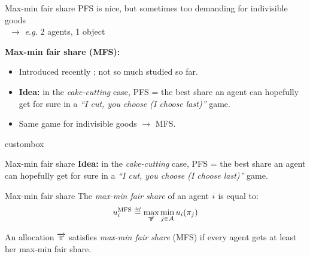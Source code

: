 \documentclass[9pt,english]{beamer}
\begin{document}
\begin{frame}{Max-min fair share}
  PFS is nice, but sometimes too demanding for indivisible goods\\
  \ \hfill $\to$ \textit{e.g.} 2 agents, 1 object

  \pause\vfill

  \begin{bibunit}[apalike]
    \textbf{Max-min fair share (MFS):}
    \begin{itemize}
    \item Introduced recently \cite{Budish11}; not so much studied so
      far.
    \item \textbf{Idea:} in the \emph{cake-cutting} case, PFS = the
      best share an agent can hopefully get for sure in a \textit{``I
        cut, you choose (I choose last)''} game.
    \item Same game for indivisible goods $\to$ MFS.
    \end{itemize}
    
    \vfill
    
    \begin{beamercolorbox}[wd=\textwidth,sep=1ex]{custombox}%
    \end{beamercolorbox}    
  \end{bibunit}
\end{frame}

\begin{frame}{Max-min fair share}
  \textbf{Idea:} in the \emph{cake-cutting} case, PFS = the
  best share an agent can hopefully get for sure in a \textit{``I
    cut, you choose (I choose last)''} game.

  \begin{block}{Max-min fair share}
    The \emph{max-min fair share} of an agent $i$ is equal to:
    \[
    \uMFS_\ag  \Def \max_{\Shares} \min_{\agp \in \Agents } u_\ag(\share_{\agp})
    \]
    
    An allocation $\overrightarrow{\pi}$ satisfies \emph{max-min fair share}
    (MFS) if every agent gets at least her max-min fair share.
  \end{block}
\end{frame}
\end{document}
